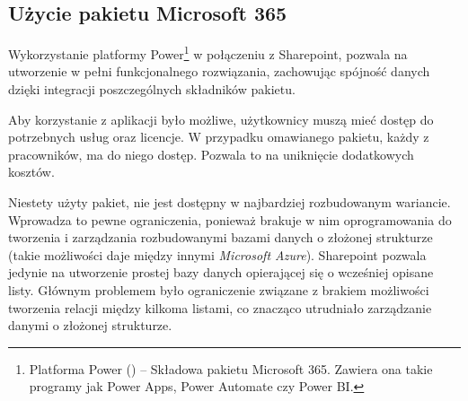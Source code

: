 \subsection{Użycie pakietu Microsoft 365}
Wykorzystanie platformy Power\footnote{Platforma Power () -- Składowa pakietu Microsoft 365. Zawiera ona takie programy jak Power Apps, Power Automate czy Power BI.} w połączeniu z Sharepoint, pozwala na utworzenie w pełni funkcjonalnego rozwiązania, zachowując spójność danych dzięki integracji poszczególnych składników pakietu.

Aby korzystanie z aplikacji było możliwe, użytkownicy muszą mieć dostęp do potrzebnych usług oraz licencje. W przypadku omawianego pakietu, każdy z pracowników, ma do niego dostęp. Pozwala to na uniknięcie dodatkowych kosztów. 

Niestety użyty pakiet, nie jest dostępny w najbardziej rozbudowanym wariancie. Wprowadza to pewne ograniczenia, ponieważ brakuje w nim oprogramowania do tworzenia i zarządzania rozbudowanymi bazami danych o złożonej strukturze (takie możliwości daje między innymi \emph{Microsoft Azure}).
Sharepoint pozwala jedynie na utworzenie prostej bazy danych opierającej się o wcześniej opisane listy.  Głównym problemem było ograniczenie związane z brakiem możliwości tworzenia relacji między kilkoma listami, co znacząco utrudniało zarządzanie danymi o złożonej strukturze.
